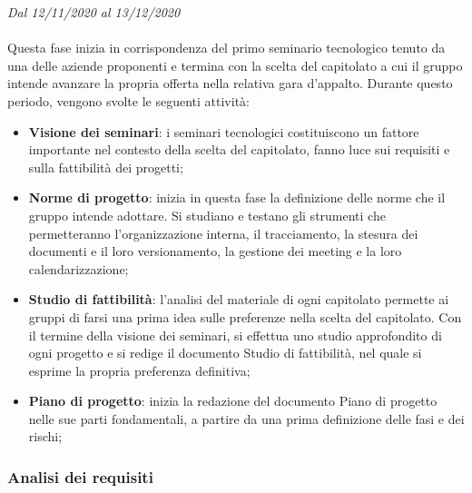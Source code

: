 \textit{Dal 12/11/2020 al 13/12/2020}
\\\\
Questa fase inizia in corrispondenza del primo seminario tecnologico tenuto da una delle aziende proponenti e termina con la scelta del capitolato a cui il gruppo intende avanzare la propria offerta nella relativa gara d'appalto.
Durante questo periodo, vengono svolte le seguenti attività:
\begin{itemize}
	\item \textbf{Visione dei seminari}: i seminari tecnologici costituiscono un fattore importante nel contesto della scelta del capitolato, fanno luce sui requisiti e sulla fattibilità dei progetti;
	\item \textbf{Norme di progetto}: inizia in questa fase la definizione delle norme che il gruppo intende adottare. Si studiano e testano gli strumenti che permetteranno l'organizzazione interna, il tracciamento, la stesura dei documenti e il loro versionamento, la gestione dei meeting e la loro calendarizzazione;
	\item \textbf{Studio di fattibilità}: l'analisi del materiale di ogni capitolato permette ai gruppi di farsi una prima idea sulle preferenze nella scelta del capitolato. Con il termine della visione dei seminari, si effettua uno studio approfondito di ogni progetto e si redige il documento Studio di fattibilità, nel quale si esprime la propria preferenza definitiva;
	\item \textbf{Piano di progetto}: inizia la redazione del documento Piano di progetto nelle sue parti fondamentali, a partire da una prima definizione delle fasi e dei rischi;
\end{itemize}  





\subsubsection{Analisi dei requisiti}

